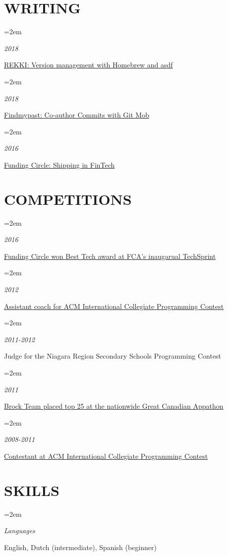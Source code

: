 \documentclass[paper=a4,fontsize=11pt]{scrartcl} %
\newlength{\spacebox}
\newcommand{\sepspace}{\vspace*{1em}}     %
\newcommand{\NewPart}[1]{\section*{\uppercase{#1}}}
\newcommand{\PersonalEntry}[2]{
    \noindent\hangindent=2em\hangafter=0  %
    \parbox{\spacebox}{                   %
    \textit{#1}}                          %
    \hspace{1.5em} #2 \par}               %
\newcommand{\SkillsEntry}[2]{             %
    \noindent\hangindent=2em\hangafter=0  %
    \parbox{\spacebox}{                   %
    \textit{#1}}                          %
    \hspace{1.5em} #2 \par}               %
\begin{document}

\NewPart{Writing}{}
\SkillsEntry{2018}{\href{https://medium.com/rekkiapp/version-management-with-brew-and-asdf-fb7aa78b98e6}{REKKI: Version management with Homebrew and asdf}}
\SkillsEntry{2018}{\href{https://web.archive.org/web/20230129020354/https://tech.findmypast.com/co-author-commits-with-git-mob/}{Findmypast: Co-author Commits with Git Mob}} %
\SkillsEntry{2016}{\href{https://web.archive.org/web/20230129014921/https://engineering.fundingcircle.com/blog/2016/09/06/shipping-in-fintech/}{Funding Circle: Shipping in FinTech}} %

\NewPart{Competitions}{}
\SkillsEntry{2016}{\href{https://www.fca.org.uk/events/techsprints/consumer-access-techsprint}{Funding Circle won Best Tech award at FCA's inaugarual TechSprint}}
\SkillsEntry{2012}{\href{https://dideler.github.io/notes/my-history-of-competitive-coding-acm-icpc}{Assistant coach for ACM International Collegiate Programming Contest}}
\SkillsEntry{2011-2012}{Judge for the Niagara Region Secondary Schools Programming Contest}
\SkillsEntry{2011}{\href{https://github.com/dideler/gps-tower-defense}{Brock Team placed top 25 at the nationwide Great Canadian Appathon}}
\SkillsEntry{2008-2011}{\href{https://dideler.github.io/notes/my-history-of-competitive-coding-acm-icpc}{Contestant at ACM International Collegiate Programming Contest}}

\NewPart{Skills}{}

\SkillsEntry{Languages}{English, Dutch (intermediate), Spanish (beginner)}

\end{document}
